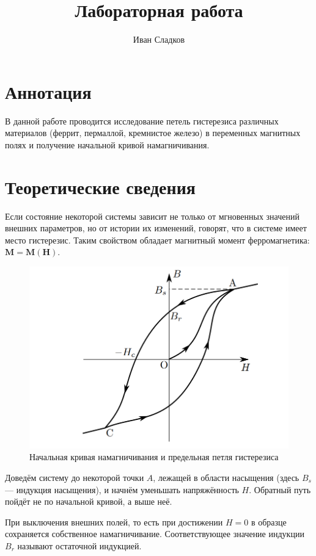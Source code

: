 \documentclass[a4paper]{article}
\title{Лабораторная работа \labnum \space \labname} %
\author{Иван Сладков}
\begin{document}
\maketitle
\thispagestyle{empty}
\section{Аннотация}
В данной работе проводится исследование петель гистерезиса различных материалов (феррит, пермаллой, кремнистое железо) в переменных магнитных полях и получение начальной кривой намагничивания.

\section{Теоретические сведения}

Если состояние некоторой системы зависит не только от мгновенных значений внешних параметров, но от истории их изменений, говорят, что в системе имеет место гистерезис. Таким свойством обладает магнитный момент ферромагнетика: $\mathbf{ M = M (H) }$. 

\begin{figure}[tpb]
	\centering
	\includegraphics[width=0.8\linewidth]{нач.кривая}
	\caption{Начальная кривая намагничивания и предельная петля гистерезиса}
	\label{fig:кривая-намагничивания}
\end{figure}

Доведём систему до некоторой точки $ A $, лежащей в области насыщения (здесь $ B_s $ — индукция насыщения), и начнём уменьшать напряжённость $ H $. Обратный путь пойдёт не по начальной кривой, а выше неё.

При выключения внешних полей, то есть при достижении $ H = 0 $ в образце сохраняется собственное намагничивание. Соответствующее значение индукции $ B_r $ называют остаточной индукцией.
\end{document}
